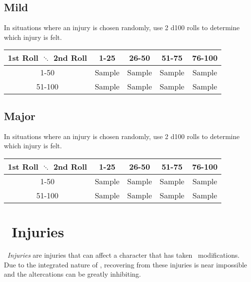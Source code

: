 \subsection{Mild}
In situations where an injury is chosen randomly, use 2 d100 rolls to determine which injury is felt.
\begin{center}
\begin{tabular}{c | c | c | c | c}
1st Roll $\ddots$ 2nd Roll & 1-25 & 26-50 & 51-75 & 76-100 \\
\hline
1-50 & Sample & Sample & Sample & Sample\\
\hline
51-100 & Sample & Sample & Sample & Sample\\
\end{tabular}
\end{center}
\begin{multicols}{2}

\end{multicols}
\subsection{Major}
In situations where an injury is chosen randomly, use 2 d100 rolls to determine which injury is felt.
\begin{center}
\begin{tabular}{c | c | c | c | c}
1st Roll $\ddots$ 2nd Roll & 1-25 & 26-50 & 51-75 & 76-100 \\
\hline
1-50 & Sample & Sample & Sample & Sample\\
\hline
51-100 & Sample & Sample & Sample & Sample\\
\end{tabular}
\end{center}
\begin{multicols}{2}

\end{multicols}

\section{\biot\ Injuries}\label{sec:bio_injuries}
\emph{\biot\ Injuries} are injuries that can affect a character that has taken \biot\ modifications. Due to the integrated nature of \biot , recovering from these injuries is near impossible and the altercations can be greatly inhibiting.
 
